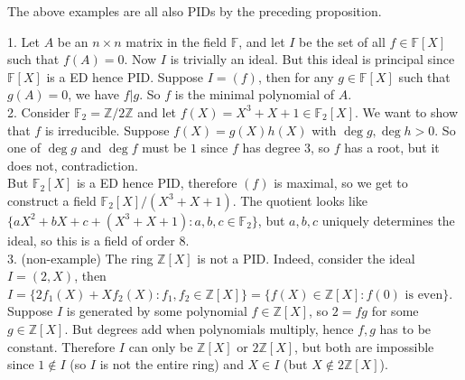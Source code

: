The above examples are all also PIDs by the preceding proposition.
\begin{example}
    1. Let $A$ be an $n\times n$ matrix in the field $\mathbb F$, and let $I$ be the set of all $f\in \mathbb F[X]$ such that $f(A)=0$.
    Now $I$ is trivially an ideal.
    But this ideal is principal since $\mathbb F[X]$ is a ED hence PID.
    Suppose $I=(f)$, then for any $g\in\mathbb F[X]$ such that $g(A)=0$, we have $f|g$.
    So $f$ is the minimal polynomial of $A$.\\
    2. Consider $\mathbb F_2=\mathbb Z/2\mathbb Z$ and let $f(X)=X^3+X+1\in\mathbb F_2[X]$.
    We want to show that $f$ is irreducible.
    Suppose $f(X)=g(X)h(X)$ with $\deg g,\deg h>0$.
    So one of $\deg g$ and $\deg f$ must be $1$ since $f$ has degree $3$, so $f$ has a root, but it does not, contradiction.\\
    But $\mathbb F_2[X]$ is a ED hence PID, therefore $(f)$ is maximal, so we get to construct a field $\mathbb F_2[X]/(X^3+X+1)$.
    The quotient looks like $\{aX^2+bX+c+(X^3+X+1):a,b,c\in\mathbb F_2\}$, but $a,b,c$ uniquely determines the ideal, so this is a field of order $8$.\\
    3. (non-example) The ring $\mathbb Z[X]$ is not a PID.
    Indeed, consider the ideal $I=(2,X)$, then $I=\{2f_1(X)+Xf_2(X):f_1,f_2\in\mathbb Z[X]\}=\{f(X)\in\mathbb Z[X]:f(0)\text{ is even}\}$.
    Suppose $I$ is generated by some polynomial $f\in\mathbb Z[X]$, so $2=fg$ for some $g\in\mathbb Z[X]$.
    But degrees add when polynomials multiply, hence $f,g$ has to be constant.
    Therefore $I$ can only be $\mathbb Z[X]$ or $2\mathbb Z[X]$, but both are impossible since $1\notin I$ (so $I$ is not the entire ring) and $X\in I$ (but $X\notin 2\mathbb Z[X]$).
\end{example}
